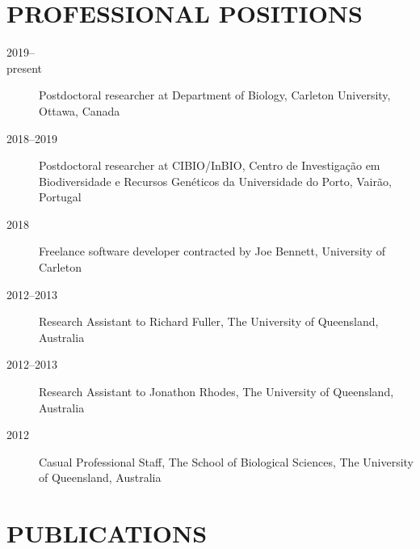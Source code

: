 \documentclass[12pt,a4paper]{article}
\begin{document}
\section*{PROFESSIONAL POSITIONS}
\begin{description}

\item[2019--\\present] Postdoctoral researcher at Department of Biology, Carleton University, Ottawa, Canada

\item[2018--2019] Postdoctoral researcher at CIBIO/InBIO, Centro de Investigação em Biodiversidade e Recursos Genéticos da Universidade do Porto, Vairão, Portugal

\item[2018] Freelance software developer contracted by Joe Bennett, University of Carleton

\item[2012--2013] Research Assistant to Richard Fuller, The University of Queensland, Australia

\item[2012--2013] Research Assistant to Jonathon Rhodes, The University of Queensland, Australia

\item[2012] Casual Professional Staff, The School of Biological Sciences, The University of Queensland, Australia

\end{description}

\clearpage

\section*{PUBLICATIONS}
\end{document}
